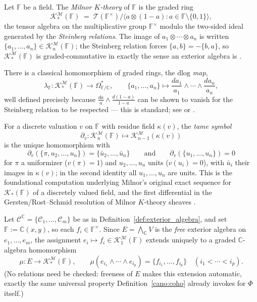 \documentclass[article,11pt]{amsart} \numberwithin{equation}{section}
\numberwithin{equation}{section}
\begin{document}
{Let $\mathbb F$ be a field. The \emph{Milnor $K$-theory} of $\mathbb F$ is the graded ring
\[
\mathcal K^\mathcal M_*(\mathbb F) \;=\; \mathcal T(\mathbb F^\times)\big/\big\langle a\otimes(1-a) : a\in \mathbb F\setminus\{0,1\}\big\rangle,
\]
the tensor algebra on the multiplicative group $\mathbb F^\times$ modulo the two-sided
ideal generated by the \emph{Steinberg relations}. The image of
$a_1\otimes\cdots\otimes a_n$ is written $\{a_1,\dots,a_n\}\in \mathcal K^\mathcal M_n(\mathbb F)$; the
Steinberg relation forces $\{a,b\}=-\{b,a\}$, so $\mathcal K^\mathcal M_*(\mathbb F)$ is
graded-commutative in exactly the sense an exterior algebra is
\cite{Milnor1970}.

There is a classical homomorphism of graded rings, the \emph{$\mathrm{dlog}$
	map},
\[
\lambda_\mathbb F: \mathcal K^\mathcal M_*(\mathbb F)\longrightarrow \Omega^*_{\mathbb F/\mathbb C},\qquad
\{a_1,\dots,a_n\}\longmapsto \frac{da_1}{a_1}\wedge\cdots\wedge\frac{da_n}{a_n},
\]
well defined precisely because $\frac{d a}{a}\wedge\frac{d(1-a)}{1-a}$ can be
shown to vanish for the Steinberg relation to be respected --- this is
standard; see \cite[\S I.3]{Weibel2013} or \cite{Milnor1970}.

For a discrete valuation $v$ on $\mathbb F$ with residue field $\kappa(v)$, the
\emph{tame symbol}
 \[\partial_v: \mathcal K^\mathcal M_n(\mathbb F)\longmapsto \mathcal K^\mathcal M_{n-1}(\kappa(v))
 \]
  is the
unique homomorphism with
\[
\partial_v(\{\pi,u_2,\dots,u_n\}) = \{\bar u_2,\dots,\bar u_n\}
\qquad\text{and}\qquad
\partial_v(\{u_1,\dots,u_n\})=0
\]
for $\pi$ a uniformizer ($v(\pi)=1$) and $u_2,\dots,u_n$ units ($v(u_i)=0$),
with $\bar u_i$ their images in $\kappa(v)$; in the second identity all
$u_1,\dots,u_n$ are units. This is the foundational computation underlying
Milnor's original exact sequence for $\mathcal K_*(\mathbb F)$ of a discretely valued field,
and the first differential in the Gersten/Rost--Schmid resolution of Milnor
$K$-theory sheaves \cite{Milnor1970,Rost1996}.

Let $\mathcal C^\mathbb C=\{\mathscr{C}_1, \dots, \mathscr{C}_m\}$ be as in Definition~\ref{def:exterior_algebra}, and set
$\mathbb F:=\mathbb C(x,y)$, so each $f_i\in \mathbb F^\times$. Since $E=\bigwedge_\mathbb C V$ is the
\emph{free} exterior algebra on $e_1,\dots,e_m$, the assignment $e_i\longmapsto
f_i\in \mathcal K^\mathcal{M} _1(\mathbb F)$ extends uniquely to a graded $\mathbb C$-algebra homomorphism
\[
\mu: E\longrightarrow \mathcal K^\mathcal M_*(\mathbb F),\qquad
\mu(e_{i_1}\wedge\cdots\wedge e_{i_p}) = \{f_{i_1},\dots,f_{i_p}\}
\quad (i_1<\cdots<i_p).
\]
(No relations need be checked: freeness of $E$ makes this extension
automatic, exactly the same universal property Definition~\ref{cano:coho} already
invokes for $\Phi$ itself.)

}
\end{document}
